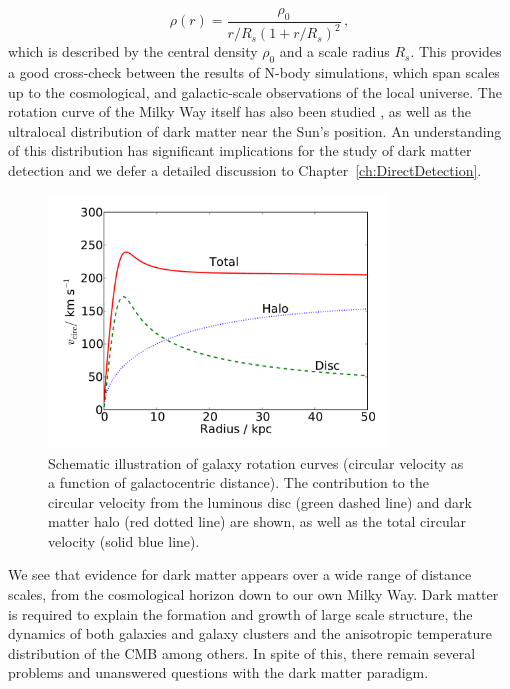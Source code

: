 \begin{equation}
\label{eq:intro:NFW}
\rho(r) = \frac{\rho_0}{r/R_s(1 + r/R_s)^2}\,,
\end{equation}
which is described by the central density $\rho_0$ and a scale radius $R_s$. This provides a good cross-check between the results of N-body simulations, which span scales up to the cosmological, and galactic-scale observations of the local universe. The rotation curve of the Milky Way itself has also been studied , as well as the ultralocal distribution of dark matter near the Sun's position. An understanding of this distribution has significant implications for the study of dark matter detection and we defer a detailed discussion to Chapter~\ref{ch:DirectDetection}.

\begin{figure}[h]

  \centering
  \includegraphics[width=0.8\textwidth]{RotationCurve.pdf}
  \caption[Schematic illustration of galaxy rotation curves]{Schematic illustration of galaxy rotation curves (circular velocity as a function of galactocentric distance). The contribution to the circular velocity from the luminous disc (green dashed line) and dark matter halo (red dotted line) are shown, as well as the total circular velocity (solid blue line). }
  \label{fig:intro:RotationCurves}
\end{figure}

We see that evidence for dark matter appears over a wide range of distance scales, from the cosmological horizon down to our own Milky Way. Dark matter is required to explain the formation and growth of large scale structure, the dynamics of both galaxies and galaxy clusters and the anisotropic temperature distribution of the CMB among others. In spite of this, there remain several problems and unanswered questions with the dark matter paradigm.

